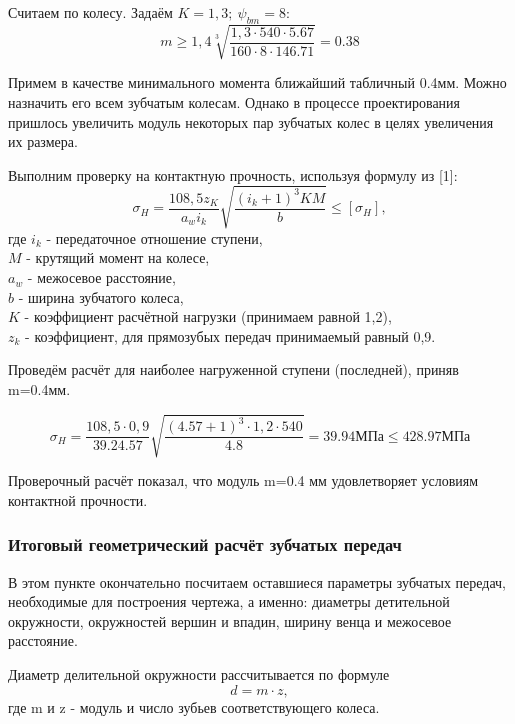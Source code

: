 \documentclass[14pt,a4paper,russian]{scrartcl}
\begin{document}
        Считаем по колесу. Задаём \( K=1,3;\ \psi_{bm}=8 \):
        \[ m \geq 1,4\sqrt[3]{\frac{1,3\cdot 540\cdot 5.67}{160\cdot 8\cdot 146.71}}=0.38 \]
        
        Примем в качестве минимального момента ближайший табличный 0.4мм. Можно назначить его
        всем зубчатым колесам. Однако в процессе проектирования пришлось увеличить модуль некоторых
        пар зубчатых колес в целях увеличения их размера.\par 
        
        Выполним проверку на контактную прочность, используя формулу из [1]:
        \[ \sigma_H = \frac{108,5 z_K}{a_w i_{k}}\sqrt{\frac{(i_k+1)^3KM}{b}} \leq [\sigma_H], \]
        где \( i_k \) - передаточное отношение ступени,\\
            \( M \) - крутящий момент на колесе,\\
            \( a_w \) - межосевое расстояние,\\
            \( b \) - ширина зубчатого колеса,\\
            \( K \) - коэффициент расчётной нагрузки (принимаем равной 1,2),\\
            \( z_k \) - коэффициент, для прямозубых передач принимаемый равный 0,9.\par
        
            Проведём расчёт для наиболее нагруженной ступени (последней), приняв m=0.4мм.

            \[ \sigma_H = \frac{108,5\cdot 0,9}{39.2 4.57}
            \sqrt{\frac{(4.57+1)^3\cdot 1,2\cdot 540}{4.8}} = 39.94 \text{МПа}\leq 428.97 \text{МПа}\]
            
        Проверочный расчёт показал, что модуль m=0.4 мм удовлетворяет условиям контактной прочности.

    
    \subsubsection{Итоговый геометрический расчёт зубчатых передач}
        В этом пункте окончательно посчитаем оставшиеся параметры зубчатых передач,
        необходимые для построения чертежа, а именно: диаметры детительной окружности, окружностей вершин
        и впадин, ширину венца и межосевое расстояние.\par

        Диаметр делительной окружности рассчитывается по формуле
        \[ d = m\cdot z, \]
        где m и z - модуль и число зубьев соответствующего колеса.\par
\end{document}
